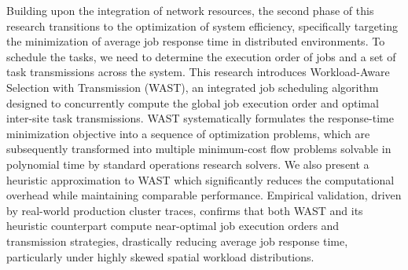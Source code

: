 \documentclass[12pt,a4paper]{Thesis} %
\begin{document}
Building upon the integration of network resources, the second phase of this research transitions to the optimization of system efficiency, specifically targeting the minimization of average job response time in distributed environments. To schedule the tasks, we need to determine the execution order of jobs and a set of task transmissions across the system. This research introduces Workload-Aware Selection with Transmission (WAST), an integrated job scheduling algorithm designed to concurrently compute the global job execution order and optimal inter-site task transmissions. WAST systematically formulates the response-time minimization objective into a sequence of optimization problems, which are subsequently transformed into multiple minimum-cost flow problems solvable in polynomial time by standard operations research solvers. We also present a heuristic approximation to WAST which significantly reduces the computational overhead while maintaining comparable performance. Empirical validation, driven by real-world production cluster traces, confirms that both WAST and its heuristic counterpart compute near-optimal job execution orders and transmission strategies, drastically reducing average job response time, particularly under highly skewed spatial workload distributions.
\end{document}
